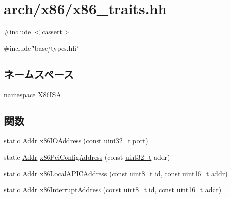 \hypertarget{x86__traits_8hh}{
\section{arch/x86/x86\_\-traits.hh}
\label{x86__traits_8hh}
}
{\ttfamily \#include $<$cassert$>$}\par
{\ttfamily \#include \char`\"{}base/types.hh\char`\"{}}\par
\subsection*{ネームスペース}
\begin{DoxyCompactItemize}
\item 
namespace \hyperlink{namespaceX86ISA}{X86ISA}
\end{DoxyCompactItemize}
\subsection*{関数}
\begin{DoxyCompactItemize}
\item 
static \hyperlink{base_2types_8hh_af1bb03d6a4ee096394a6749f0a169232}{Addr} \hyperlink{namespaceX86ISA_afaa9240a3523dc80cfb1ecfba872f27e}{x86IOAddress} (const \hyperlink{Type_8hh_a435d1572bf3f880d55459d9805097f62}{uint32\_\-t} port)
\item 
static \hyperlink{base_2types_8hh_af1bb03d6a4ee096394a6749f0a169232}{Addr} \hyperlink{namespaceX86ISA_a5b68d0901ef27939565621f528be9b94}{x86PciConfigAddress} (const \hyperlink{Type_8hh_a435d1572bf3f880d55459d9805097f62}{uint32\_\-t} addr)
\item 
static \hyperlink{base_2types_8hh_af1bb03d6a4ee096394a6749f0a169232}{Addr} \hyperlink{namespaceX86ISA_afe1cfa1e015d1bc9a1aaa13453e9af92}{x86LocalAPICAddress} (const uint8\_\-t id, const uint16\_\-t addr)
\item 
static \hyperlink{base_2types_8hh_af1bb03d6a4ee096394a6749f0a169232}{Addr} \hyperlink{namespaceX86ISA_a2f44ed2c4b9c14c0eab6bdc3b8b95c03}{x86InterruptAddress} (const uint8\_\-t id, const uint16\_\-t addr)
\end{DoxyCompactItemize}
